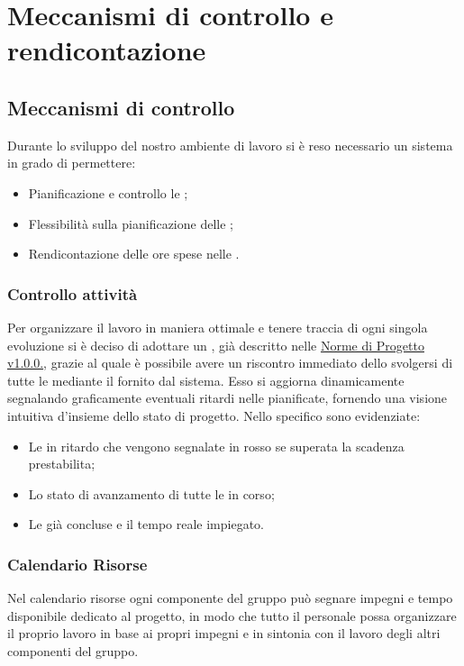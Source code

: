 \documentclass{scalatekids-article}
\begin{document}
\section{Meccanismi di controllo e rendicontazione}
\subsection{Meccanismi di controllo}
Durante lo sviluppo del nostro ambiente di lavoro si è reso necessario un sistema in grado di permettere:
\begin{itemize}
\item{Pianificazione e controllo le ;}
\item{Flessibilità sulla pianificazione delle ;}
\item{Rendicontazione delle ore spese nelle .}
\end{itemize}
\subsubsection{Controllo attività}
Per organizzare il lavoro in maniera ottimale e tenere traccia di ogni singola evoluzione si è deciso di adottare un , già descritto nelle \href{run:../Interni/NormeDiProgetto\_v1.0.0.pdf}{Norme di Progetto v1.0.0.}, grazie al quale è
possibile avere un riscontro immediato dello svolgersi di tutte le  mediante il  fornito dal sistema. Esso si aggiorna dinamicamente segnalando graficamente eventuali ritardi nelle  pianificate, fornendo una visione intuitiva d'insieme dello stato di progetto.
Nello specifico sono evidenziate:
\begin{itemize}
\item{Le  in ritardo che vengono segnalate in rosso se superata la scadenza prestabilita;}
\item{Lo stato di avanzamento di tutte le  in corso;}
\item{Le  già concluse e il tempo reale impiegato.}
\end{itemize}
\subsubsection{Calendario Risorse}
Nel calendario risorse ogni componente del gruppo può segnare impegni e tempo disponibile dedicato
al progetto, in modo che tutto il personale possa organizzare il proprio lavoro in base ai propri
impegni e in sintonia con il lavoro degli altri componenti del gruppo.
\end{document}
